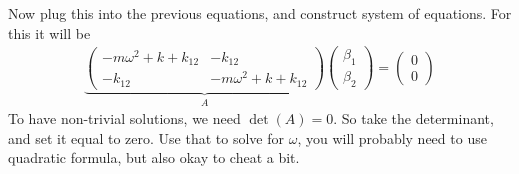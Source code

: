 \documentclass[10pt]{amsart}
\begin{document}
\begin{multicols}{2}
  Now plug this into the previous equations, and construct system of equations.
  For this it will be
  \begin{align*}
    \underbrace{
     \begin{pmatrix}
       -m\omega^2+k+k_{12} & -k_{12}\\
       -k_{12} & -m\omega^2+k+k_{12}
     \end{pmatrix}
     }_A
     \begin{pmatrix}
        \beta_1 \\ \beta_2
     \end{pmatrix}=
     \begin{pmatrix}
        0 \\ 0
     \end{pmatrix}
  \end{align*}
  To have non-trivial solutions, we need $\det(A)=0$. So take the determinant,
  and set it equal to zero. Use that to solve for $\omega$, you will probably
  need to use quadratic formula, but also okay to cheat a bit.

\end{multicols}
\end{document}

